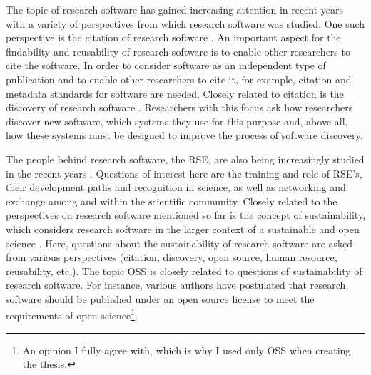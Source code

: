 \documentclass[12pt, a4paper, titlepage, oneside, abstract=true, toc=listof, toc=bibliography]{scrreprt}
\begin{document}
The topic of research software has gained increasing attention in recent years with a variety of perspectives from which research software was studied. 
One such perspective is the citation of research software \citep[e.g.][]{Allen2020, Cosmo2020, Druskat2020, Katz2020, Nielsen2019, Niemeyer2016, Soito2017}. An important aspect for the findability and reusability of research software is to enable other researchers to cite the software. In order to consider software as an independent type of publication and to enable other researchers to cite it, for example, citation and metadata standards for software are needed.
Closely related to citation is the discovery of research software \citep[e.g.][]{Howison2015, Hucka2018, MurphyHill2015, Struck2018}. Researchers with this focus ask how researchers discover new software, which systems they use for this purpose and, above all, how these systems must be designed to improve the process of software discovery. 

The people behind research software, the \gls{RSE}, are also being increasingly studied in the recent years \citep[e.g.][]{Anzt2020, Baxter2012, Brett2017, Jay2016, Katz2018, Richardson2017}. Questions of interest here are the training and role of RSE's, their development paths and recognition in science, as well as networking and exchange among and within the scientific community. 
Closely related to the perspectives on research software mentioned so far is the concept of sustainability, which considers research software in the larger context of a sustainable and open science \citep[e.g.][]{Imran2019, Badreddin2019, Cohen2018, Souza2019, Fehr2019, Katz2019, Loeffler2019, Lubbock2019, Saputri2020}. Here, questions about the sustainability of research software are asked from various perspectives (citation, discovery, open source, human resource, reusability, etc.).
The topic \gls{OSS} is closely related to questions of sustainability of research software. For instance, various authors \citep[e.g.][]{HerraizTabernero2007, Hong2019, Ince2012, Kislinskiy2016, Oishi2018, Pianosi2019, Tennant2020a} have postulated that research software should be published under an open source license to meet the requirements of open science\footnote{An opinion I fully agree with, which is why I used only OSS when creating the thesis.}.
\end{document}
